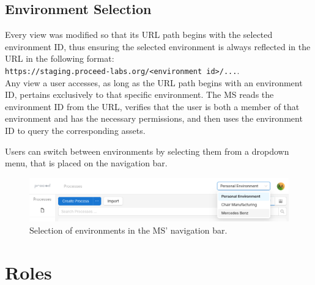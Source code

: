 
\subsection{Environment Selection}


Every view was modified so that its URL path begins with the selected environment ID,
thus ensuring the selected environment is always reflected in the URL in the following format:
\\
\lstinline{https://staging.proceed-labs.org/<environment id>/...}.
\\
Any view a user accesses, as long as the URL path begins with an environment ID, pertains exclusively to that specific environment.
The MS reads the environment ID from the URL,
verifies that the user is both a member of that environment and has the necessary permissions,
and then uses the environment ID to query the corresponding assets.

%
%

Users can switch between environments by selecting them from a dropdown menu, that is
placed on the navigation bar.


\begin{figure}[H]
	\centering
	\includegraphics[scale=0.3]{images/select-environment.png}
	\caption{Selection of environments in the MS' navigation bar.}
	\vspace{-1em} %
\end{figure}

\section{Roles}


